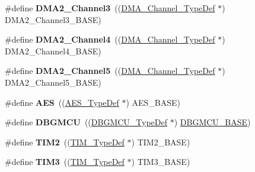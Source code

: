 \begin{DoxyCompactItemize}
\item 
\hypertarget{group___peripheral__declaration_ga6dca52a79587e0ca9a5d669048b4c7eb}{\#define {\bfseries D\-M\-A2\-\_\-\-Channel3}~((\hyperlink{struct_d_m_a___channel___type_def}{D\-M\-A\-\_\-\-Channel\-\_\-\-Type\-Def} $\ast$) D\-M\-A2\-\_\-\-Channel3\-\_\-\-B\-A\-S\-E)}\label{group___peripheral__declaration_ga6dca52a79587e0ca9a5d669048b4c7eb}

\item 
\hypertarget{group___peripheral__declaration_ga612b396657695191ad740b0b59bc9f12}{\#define {\bfseries D\-M\-A2\-\_\-\-Channel4}~((\hyperlink{struct_d_m_a___channel___type_def}{D\-M\-A\-\_\-\-Channel\-\_\-\-Type\-Def} $\ast$) D\-M\-A2\-\_\-\-Channel4\-\_\-\-B\-A\-S\-E)}\label{group___peripheral__declaration_ga612b396657695191ad740b0b59bc9f12}

\item 
\hypertarget{group___peripheral__declaration_ga521c13b7d0f82a6897d47995da392750}{\#define {\bfseries D\-M\-A2\-\_\-\-Channel5}~((\hyperlink{struct_d_m_a___channel___type_def}{D\-M\-A\-\_\-\-Channel\-\_\-\-Type\-Def} $\ast$) D\-M\-A2\-\_\-\-Channel5\-\_\-\-B\-A\-S\-E)}\label{group___peripheral__declaration_ga521c13b7d0f82a6897d47995da392750}

\item 
\hypertarget{group___peripheral__declaration_ga5412ac9ff64f4ab68c289a0da739eaef}{\#define {\bfseries A\-E\-S}~((\hyperlink{struct_a_e_s___type_def}{A\-E\-S\-\_\-\-Type\-Def} $\ast$) A\-E\-S\-\_\-\-B\-A\-S\-E)}\label{group___peripheral__declaration_ga5412ac9ff64f4ab68c289a0da739eaef}

\item 
\hypertarget{group___peripheral__declaration_ga92ec6d9ec2251fda7d4ce09748cd74b4}{\#define {\bfseries D\-B\-G\-M\-C\-U}~((\hyperlink{struct_d_b_g_m_c_u___type_def}{D\-B\-G\-M\-C\-U\-\_\-\-Type\-Def} $\ast$) \hyperlink{group___peripheral__memory__map_ga4adaf4fd82ccc3a538f1f27a70cdbbef}{D\-B\-G\-M\-C\-U\-\_\-\-B\-A\-S\-E})}\label{group___peripheral__declaration_ga92ec6d9ec2251fda7d4ce09748cd74b4}

\item 
\hypertarget{group___peripheral__declaration_ga3cfac9f2e43673f790f8668d48b4b92b}{\#define {\bfseries T\-I\-M2}~((\hyperlink{struct_t_i_m___type_def}{T\-I\-M\-\_\-\-Type\-Def} $\ast$) T\-I\-M2\-\_\-\-B\-A\-S\-E)}\label{group___peripheral__declaration_ga3cfac9f2e43673f790f8668d48b4b92b}

\item 
\hypertarget{group___peripheral__declaration_ga61ee4c391385607d7af432b63905fcc9}{\#define {\bfseries T\-I\-M3}~((\hyperlink{struct_t_i_m___type_def}{T\-I\-M\-\_\-\-Type\-Def} $\ast$) T\-I\-M3\-\_\-\-B\-A\-S\-E)}\label{group___peripheral__declaration_ga61ee4c391385607d7af432b63905fcc9}


\end{DoxyCompactItemize}
